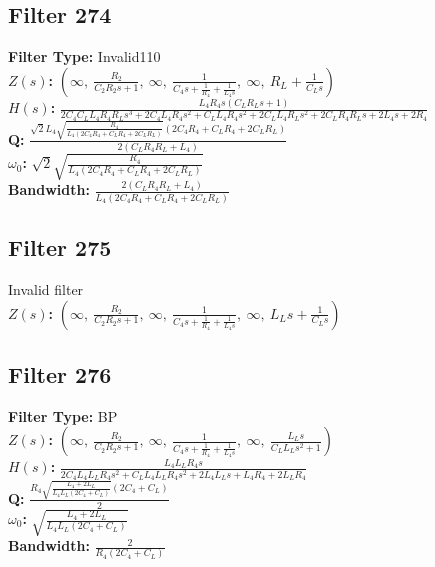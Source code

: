 \documentclass{article}
\begin{document}
\subsection*{Filter 274}
\textbf{Filter Type:} Invalid110 \\ 
\textbf{$Z(s)$:} $\left( \infty, \  \frac{R_{2}}{C_{2} R_{2} s + 1}, \  \infty, \  \frac{1}{C_{4} s + \frac{1}{R_{4}} + \frac{1}{L_{4} s}}, \  \infty, \  R_{L} + \frac{1}{C_{L} s}\right)$ \\ 
\textbf{$H(s)$:} $\frac{L_{4} R_{4} s \left(C_{L} R_{L} s + 1\right)}{2 C_{4} C_{L} L_{4} R_{4} R_{L} s^{3} + 2 C_{4} L_{4} R_{4} s^{2} + C_{L} L_{4} R_{4} s^{2} + 2 C_{L} L_{4} R_{L} s^{2} + 2 C_{L} R_{4} R_{L} s + 2 L_{4} s + 2 R_{4}}$ \\ 
\textbf{Q:} $\frac{\sqrt{2} L_{4} \sqrt{\frac{R_{4}}{L_{4} \left(2 C_{4} R_{4} + C_{L} R_{4} + 2 C_{L} R_{L}\right)}} \left(2 C_{4} R_{4} + C_{L} R_{4} + 2 C_{L} R_{L}\right)}{2 \left(C_{L} R_{4} R_{L} + L_{4}\right)}$ \\ 
\textbf{$\omega_0$:} $\sqrt{2} \sqrt{\frac{R_{4}}{L_{4} \left(2 C_{4} R_{4} + C_{L} R_{4} + 2 C_{L} R_{L}\right)}}$ \\ 
\textbf{Bandwidth:} $\frac{2 \left(C_{L} R_{4} R_{L} + L_{4}\right)}{L_{4} \left(2 C_{4} R_{4} + C_{L} R_{4} + 2 C_{L} R_{L}\right)}$ \\ 
\subsection*{Filter 275}
Invalid filter \\ 
\textbf{$Z(s)$:} $\left( \infty, \  \frac{R_{2}}{C_{2} R_{2} s + 1}, \  \infty, \  \frac{1}{C_{4} s + \frac{1}{R_{4}} + \frac{1}{L_{4} s}}, \  \infty, \  L_{L} s + \frac{1}{C_{L} s}\right)$ \\ 
\subsection*{Filter 276}
\textbf{Filter Type:} BP \\ 
\textbf{$Z(s)$:} $\left( \infty, \  \frac{R_{2}}{C_{2} R_{2} s + 1}, \  \infty, \  \frac{1}{C_{4} s + \frac{1}{R_{4}} + \frac{1}{L_{4} s}}, \  \infty, \  \frac{L_{L} s}{C_{L} L_{L} s^{2} + 1}\right)$ \\ 
\textbf{$H(s)$:} $\frac{L_{4} L_{L} R_{4} s}{2 C_{4} L_{4} L_{L} R_{4} s^{2} + C_{L} L_{4} L_{L} R_{4} s^{2} + 2 L_{4} L_{L} s + L_{4} R_{4} + 2 L_{L} R_{4}}$ \\ 
\textbf{Q:} $\frac{R_{4} \sqrt{\frac{L_{4} + 2 L_{L}}{L_{4} L_{L} \left(2 C_{4} + C_{L}\right)}} \left(2 C_{4} + C_{L}\right)}{2}$ \\ 
\textbf{$\omega_0$:} $\sqrt{\frac{L_{4} + 2 L_{L}}{L_{4} L_{L} \left(2 C_{4} + C_{L}\right)}}$ \\ 
\textbf{Bandwidth:} $\frac{2}{R_{4} \left(2 C_{4} + C_{L}\right)}$ \\ 
\end{document}
